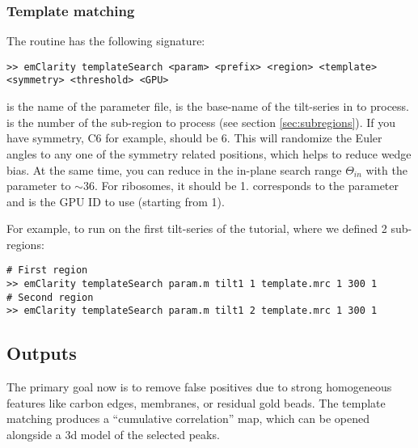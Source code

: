 \subsubsection{Template matching}

The  routine has the following signature:
\begin{lstlisting}
>> emClarity templateSearch <param> <prefix> <region> <template> <symmetry> <threshold> <GPU>
\end{lstlisting}
 is the name of the parameter file,  is the base-name of the tilt-series in  to process.  is the number of the sub-region to process (see section \ref{sec:subregions}). If you have symmetry, C6 for example,  should be 6. This will randomize the Euler angles to any one of the symmetry related positions, which helps to reduce wedge bias. At the same time, you can reduce in the in-plane search range $\Theta_{in}$ with the  parameter to $\sim$36\textdegree. For ribosomes, it should be 1.  corresponds to the  parameter and  is the GPU ID to use (starting from 1).

For example, to run  on the first tilt-series of the tutorial, where we defined 2 sub-regions:
\begin{lstlisting}
# First region
>> emClarity templateSearch param.m tilt1 1 template.mrc 1 300 1
# Second region
>> emClarity templateSearch param.m tilt1 2 template.mrc 1 300 1
\end{lstlisting}

\subsection{Outputs}

The primary goal now is to remove false positives due to strong homogeneous features like carbon edges, membranes, or residual gold beads. The template matching produces a ``cumulative correlation'' map, which can be opened alongside a 3d model of the selected peaks.

